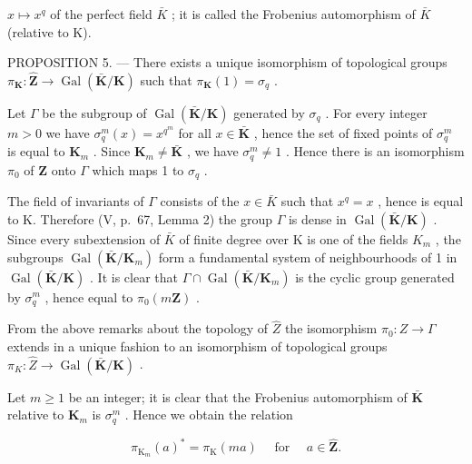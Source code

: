 \(x \mapsto x^{q}\) of the perfect field \(\bar{K}\) ; it is called the Frobenius automorphism of \(\bar{K}\) (relative to K).

PROPOSITION 5. --- There exists a unique isomorphism of topological groups \(\pi_{\mathbf{K}}: \hat{\mathbf{Z}} \to \operatorname{Gal}(\bar{\mathbf{K}} / \mathbf{K})\) such that \(\pi_{\mathbf{K}}(1) = \sigma_q\) .

Let \(\Gamma\) be the subgroup of \(\operatorname{Gal}(\bar{\mathbf{K}} / \mathbf{K})\) generated by \(\sigma_q\) . For every integer \(m > 0\) we have \(\sigma_q^m (x) = x^{q^m}\) for all \(x\in \bar{\mathbf{K}}\) , hence the set of fixed points of \(\sigma_q^m\) is equal to \(\mathbf{K}_m\) . Since \(\mathbf{K}_m\neq \bar{\mathbf{K}}\) , we have \(\sigma_q^m\neq 1\) . Hence there is an isomorphism \(\pi_0\) of \(\mathbf{Z}\) onto \(\Gamma\) which maps 1 to \(\sigma_q\) .

The field of invariants of \(\Gamma\) consists of the \(x \in \bar{K}\) such that \(x^{q} = x\) , hence is equal to K. Therefore (V, p.~67, Lemma 2) the group \(\Gamma\) is dense in \(\operatorname{Gal}(\bar{\mathbf{K}}/\mathbf{K})\) . Since every subextension of \(\bar{K}\) of finite degree over K is one of the fields \(K_{m}\) , the subgroups \(\operatorname{Gal}(\bar{\mathbf{K}}/\mathbf{K}_{m})\) form a fundamental system of neighbourhoods of 1 in \(\operatorname{Gal}(\bar{\mathbf{K}}/\mathbf{K})\) . It is clear that \(\Gamma \cap \operatorname{Gal}(\bar{\mathbf{K}}/\mathbf{K}_{m})\) is the cyclic group generated by \(\sigma_{q}^{m}\) , hence equal to \(\pi_{0}(m\mathbf{Z})\) .

From the above remarks about the topology of \(\hat{Z}\) the isomorphism \(\pi_{0}:Z\to\Gamma\) extends in a unique fashion to an isomorphism of topological groups \(\pi_{K}:\hat{Z}\to\operatorname{Gal}(\bar{\mathbf{K}}/\mathbf{K})\) .

Let \(m \geqslant 1\) be an integer; it is clear that the Frobenius automorphism of \(\bar{\mathbf{K}}\) relative to \(\mathbf{K}_m\) is \(\sigma_q^m\) . Hence we obtain the relation

\[
\pi_ {\mathrm{K} _ {m}} (a) ^ {*} = \pi_ {\mathrm{K}} (m a) \quad \text { for } \quad a \in \hat {\mathbf {Z}}.\tag{5}
\]


